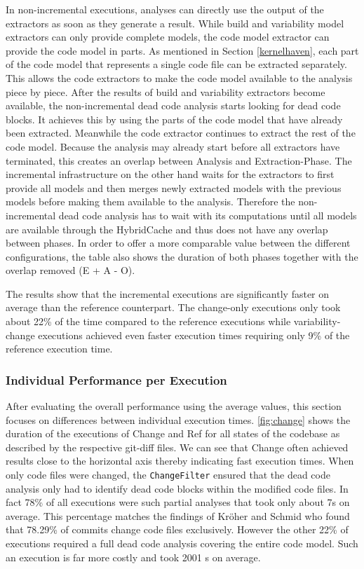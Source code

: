 \documentclass[a4paper]{article}
\begin{document}
In non-incremental executions, analyses can directly use the output of the extractors as soon as they generate a result. While build and variability model extractors can only provide complete models, the code model extractor can provide the code model in parts. As mentioned in Section \ref{kernelhaven}, each part of the code model that represents a single code file can be extracted separately. This allows the code extractors to make the code model available to the analysis piece by piece.
After the results of build and variability extractors become available, the non-incremental dead code analysis starts looking for dead code blocks. It achieves this by using the parts of the code model that  have already been extracted. Meanwhile the code extractor continues to extract the rest of the code model. Because the analysis may already start before all extractors have terminated, this creates an overlap between Analysis and Extraction-Phase. The incremental infrastructure on the other hand waits for the extractors to first provide all models and then merges newly extracted models with the previous models before making them available to the analysis. Therefore the non-incremental dead code analysis has to wait with its computations until all models are available through the HybridCache and thus does not have any overlap between phases. In order to offer a more comparable value between the different configurations, the table also shows the duration of both phases together with the overlap removed (E + A - O). 


The results show that the incremental executions are significantly faster on average than the reference counterpart. The change-only executions only took about 22\% of the time compared to the reference executions while variability-change executions achieved even faster execution times requiring only 9\% of the reference execution time.

\subsubsection{Individual Performance per Execution}\label{individual-performance}

After evaluating the overall performance using the average values, this section focuses on differences between individual execution times. \autoref{fig:change} shows the duration of the executions of Change and Ref for all states of the codebase as described by the respective git-diff files. We can see that Change often achieved results close to the horizontal axis thereby indicating fast execution times. When only code files were changed, the \texttt{ChangeFilter} ensured that the dead code analysis only had to identify dead code blocks within the modified code files. In fact 78\% of all executions were such partial analyses that took only about 7s on average. This percentage matches the findings of Kr\"oher and Schmid \cite{ComAn} who found that 78.29\% of commits change code files exclusively. However the other 22\% of executions required a full dead code analysis covering the entire code model. Such an execution is far more costly and took 2001 s on average. 
\end{document}
